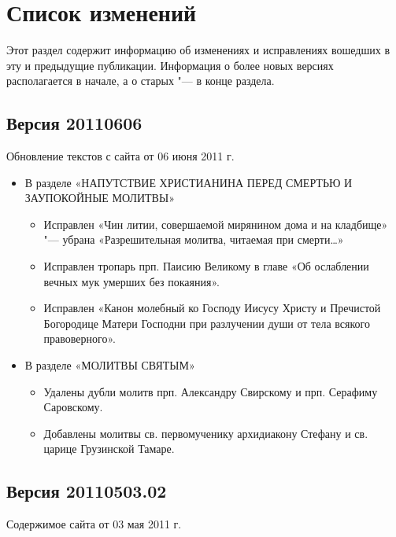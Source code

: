 \chapter*{Список изменений}

Этот раздел содержит информацию об изменениях и исправлениях вошедших в эту и предыдущие публикации. Информация о более новых версиях располагается в начале, а о старых "--- в конце раздела.
 

\small

\section*{Версия 20110606}

Обновление текстов с сайта от 06 июня 2011 г.
\begin{itemize}

\item В разделе «НАПУТСТВИЕ ХРИСТИАНИНА ПЕРЕД СМЕРТЬЮ И ЗАУПОКОЙНЫЕ МОЛИТВЫ»
\begin{itemize}
\item Исправлен «Чин литии, совершаемой мирянином дома и на кладбище» "--- убрана «Разрешительная молитва, читаемая при смерти\ldots»
\item Исправлен тропарь прп. Паисию Великому в главе «Об ослаблении вечных мук умерших без покаяния».
\item Исправлен «Канон молебный ко Господу Иисусу Христу и Пречистой Богородице Матери Господни при разлучении души от тела всякого правоверного».
\end{itemize}

\item В разделе «МОЛИТВЫ СВЯТЫМ»
\begin{itemize}
\item Удалены дубли молитв прп. Александру Свирскому и прп. Серафиму Саровскому.
\item Добавлены молитвы св. первомученику архидиакону Стефану и св. царице Грузинской Тамаре.
\end{itemize}
\end{itemize}


\section*{Версия 20110503.02}
Содержимое сайта от 03 мая 2011 г.

\normalfont
